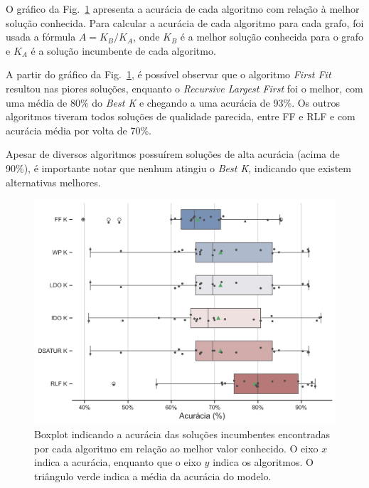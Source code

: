 \documentclass[10pt, twocolumn]{article}
\begin{document}


O gráfico da Fig.~\ref{fig:boxplot} apresenta a acurácia de cada algoritmo com
relação à melhor solução conhecida.
Para calcular a acurácia de cada algoritmo para cada grafo, foi usada a fórmula
$A=K_{B}/K_A$, onde $K_{B}$ é a melhor solução conhecida para o grafo e
$K_A$ é a solução incumbente de cada algoritmo.



A partir do gráfico da Fig.~\ref{fig:boxplot}, é possível observar que o algoritmo
\emph{First Fit} resultou nas piores soluções, enquanto o \emph{Recursive Largest First}
foi o melhor, com uma média de 80\% do \emph{Best K} e chegando a uma acurácia de 93\%.
Os outros algoritmos tiveram todos soluções de qualidade parecida, entre FF e RLF
e com acurácia média por volta de 70\%.

Apesar de diversos algoritmos possuírem soluções de alta acurácia (acima de 90\%),
é importante notar que nenhum atingiu o \emph{Best K}, indicando que existem
alternativas melhores.

\begin{figure}[ht]
  \centering
  \includegraphics[scale=0.42]{img/boxplot.png}
  \caption{Boxplot indicando a acurácia das soluções incumbentes encontradas por
  cada algoritmo em relação ao melhor valor conhecido.
  O eixo $x$ indica a acurácia, enquanto que o eixo $y$ indica os algoritmos.
  O triângulo verde indica a média da acurácia do modelo.
  }
  \label{fig:boxplot}
\end{figure}
\end{document}
